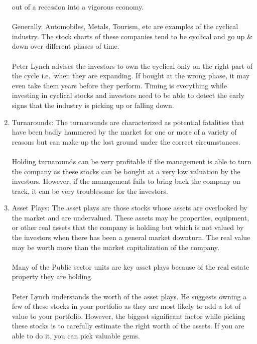 \begin{enumerate}
        out of a recession into a vigorous economy.\\\\
        Generally, Automobiles, Metals, Tourism, etc are examples of the cyclical
        industry. The stock charts of these companies tend to be cyclical and go
        up \& down over different phases of time.\\\\
        Peter Lynch advises the investors to own the cyclical only on the right
        part of the cycle i.e.\ when they are expanding. If bought at the wrong
        phase, it may even take them years before they perform. Timing is
        everything while investing in cyclical stocks and investors need to be
        able to detect the early signs that the industry is picking up or falling
        down.
    \item Turnarounds: The turnarounds are characterized as potential fatalities
        that have been badly hammered by the market for one or more of a variety
        of reasons but can make up the lost ground under the correct circumstances.\\\\
        Holding turnarounds can be very profitable if the management is able to
        turn the company as these stocks can be bought at a very low valuation
        by the investors. However, if the management fails to bring back the
        company on track, it can be very troublesome for the investors.
    \item Asset Plays: The asset plays are those stocks whose assets are
        overlooked by the market and are undervalued. These assets may be
        properties, equipment, or other real assets that the company is holding
        but which is not valued by the investors when there has been a general
        market downturn. The real value may be worth more than the market
        capitalization of the company.\\\\
        Many of the Public sector units are key asset plays because of the real
        estate property they are holding.\\\\
        Peter Lynch understands the worth of the asset plays. He suggests owning
        a few of these stocks in your portfolio as they are most likely to add a
        lot of value to your portfolio. However, the biggest significant factor
        while picking these stocks is to carefully estimate the right worth of
        the assets. If you are able to do it, you can pick valuable gems.
\end{enumerate}

